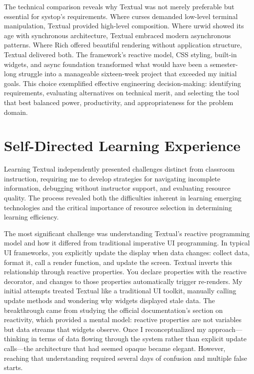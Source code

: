\documentclass[12pt,a4paper]{article}
\begin{document}
The technical comparison reveals why Textual was not merely preferable but essential for systop's requirements. Where curses demanded low-level terminal manipulation, Textual provided high-level composition. Where urwid showed its age with synchronous architecture, Textual embraced modern asynchronous patterns. Where Rich offered beautiful rendering without application structure, Textual delivered both. The framework's reactive model, CSS styling, built-in widgets, and async foundation transformed what would have been a semester-long struggle into a manageable sixteen-week project that exceeded my initial goals. This choice exemplified effective engineering decision-making: identifying requirements, evaluating alternatives on technical merit, and selecting the tool that best balanced power, productivity, and appropriateness for the problem domain.

\section*{Self-Directed Learning Experience}

Learning Textual independently presented challenges distinct from classroom instruction, requiring me to develop strategies for navigating incomplete information, debugging without instructor support, and evaluating resource quality. The process revealed both the difficulties inherent in learning emerging technologies and the critical importance of resource selection in determining learning efficiency.

The most significant challenge was understanding Textual's reactive programming model and how it differed from traditional imperative UI programming. In typical UI frameworks, you explicitly update the display when data changes: collect data, format it, call a render function, and update the screen. Textual inverts this relationship through reactive properties. You declare properties with the reactive decorator, and changes to those properties automatically trigger re-renders. My initial attempts treated Textual like a traditional UI toolkit, manually calling update methods and wondering why widgets displayed stale data. The breakthrough came from studying the official documentation's section on reactivity, which provided a mental model: reactive properties are not variables but data streams that widgets observe. Once I reconceptualized my approach—thinking in terms of data flowing through the system rather than explicit update calls—the architecture that had seemed opaque became elegant. However, reaching that understanding required several days of confusion and multiple false starts.
\end{document}
